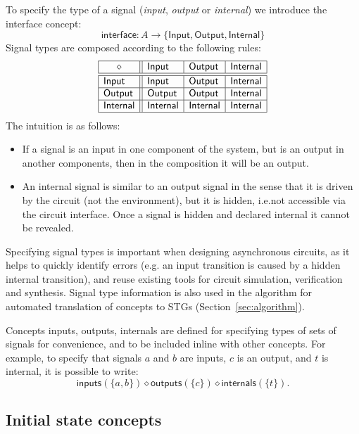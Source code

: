 \documentclass[british, journal]{IEEEtran}
\begin{document}
To specify the type of a signal (\emph{input},
\emph{output} or \emph{internal}) we introduce the \textsf{interface} concept:
\[
\mathsf{interface} : A \rightarrow \{\mathsf{Input}, \mathsf{Output},
\mathsf{Internal}\}
\]
Signal types are composed according to the following rules:
\[
\begin{array}{|l||l|l|l|}
\hline
\multicolumn{1}{|c||}{\diamond} & \mathsf{Input} & \mathsf{Output} &
\mathsf{Internal} \\ \hline \hline
\mathsf{Input} & \mathsf{Input} & \mathsf{Output} & \mathsf{Internal} \\ \hline
\mathsf{Output} & \mathsf{Output} & \mathsf{Output} & \mathsf{Internal} \\
\hline
\mathsf{Internal}& \mathsf{Internal} & \mathsf{Internal} & \mathsf{Internal} \\
\hline
\end{array}
\]
The intuition is as follows:
\begin{itemize}
    \item If a signal is an input in one component of the system, but is an
    output in another components, then in the composition it will be an output.
    \item An internal signal is similar to an output signal in the sense
that it is driven by the circuit (not the environment), but it is hidden, i.e.not accessible via the circuit interface. Once a signal is hidden and declared    internal it cannot be revealed.
\end{itemize}

\noindent Specifying signal types is important when designing asynchronous
circuits, as it helps to quickly identify errors (e.g. an input transition is
caused by a hidden internal transition), and reuse existing tools for circuit
simulation, verification and synthesis. Signal type information is also used
in the algorithm for automated translation of concepts to
STGs (Section~\ref{sec:algorithm}).

Concepts \textsf{inputs}, \textsf{outputs}, \textsf{internals} are defined for
specifying types of sets of signals for convenience, and to be included inline with other
concepts. For example, to specify
that signals $a$ and $b$ are inputs, $c$ is an output, and $t$ is internal, it
is possible to write:
\[
\mathsf{inputs}(\{a, b\}) \diamond \mathsf{outputs}(\{c\}) \diamond
\mathsf{internals}(\{t\}).
\]

\subsection{Initial state concepts \label{sub:initState}}
\end{document}
